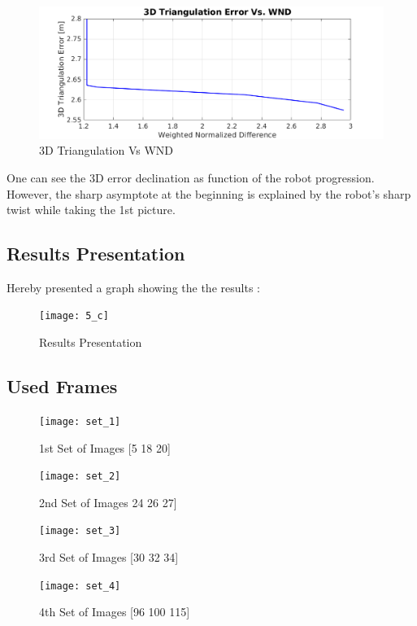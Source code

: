 \documentclass[a4paper]{article}
\begin{document}
\begin{figure}[H]
\centering
\includegraphics[scale=0.56]{3DvsWND}
\caption{3D Triangulation Vs WND} 
\end{figure} 

One can see the 3D error declination as function of the robot progression. However, the sharp asymptote at the beginning is explained by the robot's sharp twist while taking the 1st picture.
\newpage

\subsection{ Results Presentation }


Hereby presented a graph showing the the results :
\begin{figure}[H]
\centering
\texttt{[image: 5\_c]}
\caption{Results Presentation} 
\end{figure} 
\newpage

\subsection{ Used Frames }
\begin{figure}[H]
\centering
\texttt{[image: set\_1]}
\caption{1st Set of Images [5 18 20]} 
\end{figure} 

\begin{figure}[H]
\centering
\texttt{[image: set\_2]}
\caption{2nd Set of Images 24 26 27]} 
\end{figure} 

\begin{figure}[H]
\centering
\texttt{[image: set\_3]}
\caption{3rd Set of Images [30 32 34]} 
\end{figure} 

\begin{figure}[H]
\centering
\texttt{[image: set\_4]}
\caption{4th Set of Images [96 100 115]} 
\end{figure} 
\end{document}
